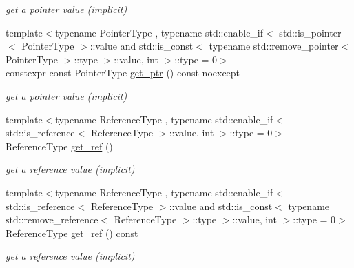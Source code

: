 \begin{DoxyCompactItemize}
\begin{DoxyCompactList}\small\item\em get a pointer value (implicit) \end{DoxyCompactList}\item 
{\footnotesize template$<$typename Pointer\+Type , typename std\+::enable\+\_\+if$<$                                                              std\+::is\+\_\+pointer$<$ Pointer\+Type $>$\+::value and                                                           std\+::is\+\_\+const$<$ typename std\+::remove\+\_\+pointer$<$ Pointer\+Type $>$\+::type $>$\+::value, int $>$\+::type  = 0$>$ }\\constexpr const Pointer\+Type \hyperlink{classnlohmann_1_1basic__json_aad65e0bc388897192bf361c24c1d6dda}{get\+\_\+ptr} () const  noexcept
\begin{DoxyCompactList}\small\item\em get a pointer value (implicit) \end{DoxyCompactList}\item 
{\footnotesize template$<$typename Reference\+Type , typename std\+::enable\+\_\+if$<$                                                              std\+::is\+\_\+reference$<$ Reference\+Type $>$\+::value, int $>$\+::type  = 0$>$ }\\Reference\+Type \hyperlink{classnlohmann_1_1basic__json_a4f332e90f3cae562d0c3fa6ba48f74f9}{get\+\_\+ref} ()
\begin{DoxyCompactList}\small\item\em get a reference value (implicit) \end{DoxyCompactList}\item 
{\footnotesize template$<$typename Reference\+Type , typename std\+::enable\+\_\+if$<$                                                              std\+::is\+\_\+reference$<$ Reference\+Type $>$\+::value and                                                           std\+::is\+\_\+const$<$ typename std\+::remove\+\_\+reference$<$ Reference\+Type $>$\+::type $>$\+::value, int $>$\+::type  = 0$>$ }\\Reference\+Type \hyperlink{classnlohmann_1_1basic__json_aa669d997ddc03566de5438781254b32b}{get\+\_\+ref} () const 
\begin{DoxyCompactList}\small\item\em get a reference value (implicit) \end{DoxyCompactList}\item 

\end{DoxyCompactItemize}
